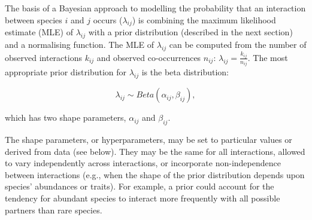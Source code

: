 \documentclass[12pt]{article}
\begin{document}
\begin{spacing}{1.5}

    The basis of a Bayesian approach to modelling the probability that an interaction between species $i$ and $j$ occurs ($\lambda_{ij}$) is combining the maximum likelihood estimate (MLE) of $\lambda_{ij}$ with a prior distribution (described in the next section) and a normalising function. The MLE of $\lambda_{ij}$ can be computed from the number of observed interactions $k_{ij}$ and observed co-occurrences $n_{ij}$: $\lambda_{ij}=\frac{k_{ij}}{n_{ij}}$. The most appropriate prior distribution for $\lambda_{ij}$ is the beta distribution:


    \begin{equation}
          \lambda_{ij} \sim Beta(\alpha_{ij},\beta_{ij}) , \label{prior}
        \end{equation}

        \noindent which has two shape parameters, $\alpha_{ij}$ and $\beta_{ij}$. 


    The shape parameters, or hyperparameters, may be set to particular values or derived from data (see below). They may be the same for all interactions, allowed to vary independently across interactions, or incorporate non-independence between interactions (e.g., when the shape of the prior distribution depends upon species' abundances or traits). For example, a prior could account for the tendency for abundant species to interact more frequently with all possible partners than rare species.



\end{spacing}
\end{document}
